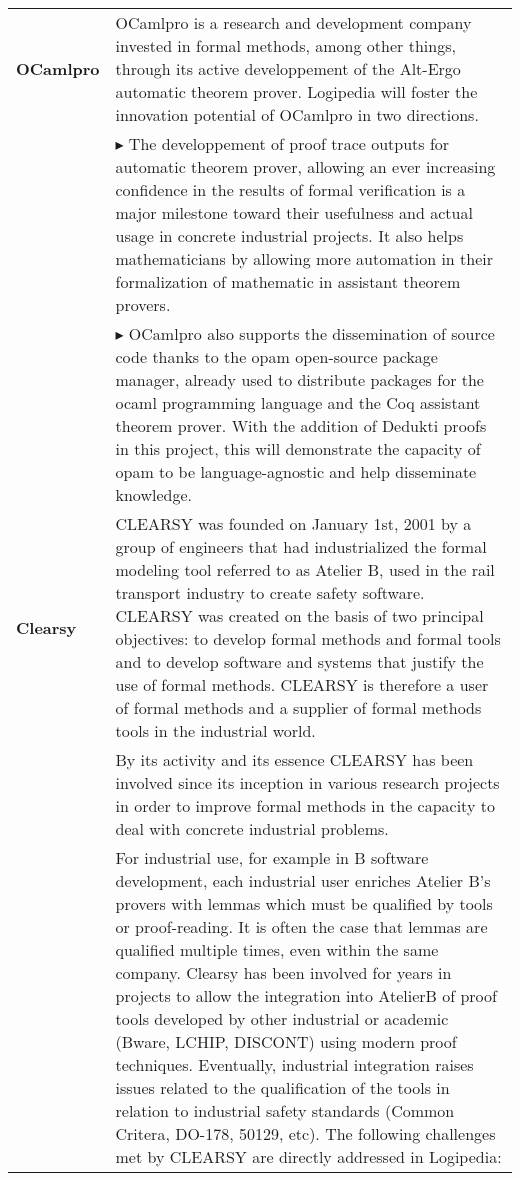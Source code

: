 \begin{longtable}{|p{}|p{}|}
\hline
{\bf OCamlpro} &

OCamlpro is a research and development company invested in formal
methods, among other things, through its active developpement of the
Alt-Ergo automatic theorem prover. Logipedia will foster the innovation
potential of OCamlpro in two directions.\\

&
$\blacktriangleright$
The developpement of proof trace
outputs for automatic theorem prover, allowing an ever increasing
confidence in the results of formal verification is a major milestone
toward their usefulness and actual usage in concrete industrial
projects. It also helps mathematicians by allowing more automation in
their formalization of mathematic in assistant theorem provers.
\\

&
$\blacktriangleright$
OCamlpro also supports the dissemination of source code thanks to
the opam open-source package manager, already used to distribute packages
for the ocaml programming language and the Coq assistant theorem prover.
With the addition of Dedukti proofs in this project, this will demonstrate
the capacity of opam to be language-agnostic and help disseminate knowledge.
\\

\hline
{\bf Clearsy} &

CLEARSY was founded on January 1st, 2001 by a group of engineers that
had industrialized the formal modeling tool referred to as Atelier B,
used in the rail transport industry to create safety software. CLEARSY
was created on the basis of two principal objectives:
to develop formal methods and formal tools and 
to develop software and systems that justify the use of formal methods.
CLEARSY is therefore a user of formal methods and a supplier of
formal methods tools in the industrial world.\\

&
\hspace{0.4cm}
By its activity and its essence CLEARSY has been involved since its
inception in various research projects in order to improve formal
methods in the capacity to deal with concrete industrial problems.\\

&
\hspace{0.4cm}
For industrial use, for example in B software development, each
industrial user enriches Atelier B's provers with lemmas which must be
qualified by tools or proof-reading.  It is often the case that lemmas
are qualified multiple times, even within the same company.  Clearsy
has been involved for years in projects to allow the integration into
AtelierB of proof tools developed by other industrial or academic
(Bware, LCHIP, DISCONT) using modern proof techniques.  Eventually,
industrial integration raises issues related to the qualification of
the tools in relation to industrial safety standards (Common Critera,
DO-178, 50129, etc).  The following challenges met by CLEARSY are
directly addressed in Logipedia:\\


\end{longtable}
